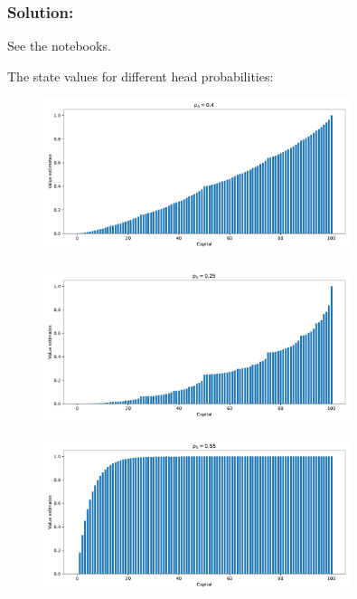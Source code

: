 \subsubsection*{Solution:}

See the notebooks.

The state values for different head probabilities:

\begin{figure}[H]
    \centering
    \includegraphics[width=0.8\textwidth]{chapters_latex/figures/ex_04_09_values_04.pdf}
\end{figure}

\begin{figure}[H]
    \centering
    \includegraphics[width=0.8\textwidth]{chapters_latex/figures/ex_04_09_values_025.pdf}
\end{figure}

\begin{figure}[H]
    \centering
    \includegraphics[width=0.8\textwidth]{chapters_latex/figures/ex_04_09_values_055.pdf}
\end{figure}

